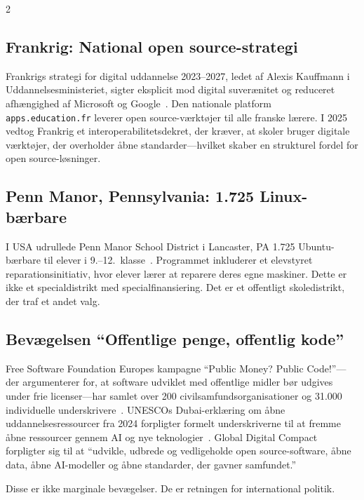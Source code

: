 \documentclass[11pt, a4paper]{article}
\begin{document}
\begin{multicols}{2}
\subsection{Frankrig: National open source-strategi}

Frankrigs strategi for digital uddannelse 2023--2027, ledet af Alexis Kauffmann i Uddannelsesministeriet, sigter eksplicit mod digital suverænitet og reduceret afhængighed af Microsoft og Google~\citep{france2023digital}. Den nationale platform \texttt{apps.education.fr} leverer open source-værktøjer til alle franske lærere. I 2025 vedtog Frankrig et interoperabilitetsdekret, der kræver, at skoler bruger digitale værktøjer, der overholder åbne standarder---hvilket skaber en strukturel fordel for open source-løsninger.

\subsection{Penn Manor, Pennsylvania: 1.725 Linux-bærbare}

I USA udrullede Penn Manor School District i Lancaster, PA 1.725 Ubuntu-bærbare til elever i 9.--12.\ klasse~\citep{pennmanor2024linux}. Programmet inkluderer et elevstyret reparationsinitiativ, hvor elever lærer at reparere deres egne maskiner. Dette er ikke et specialdistrikt med specialfinansiering. Det er et offentligt skoledistrikt, der traf et andet valg.

\subsection{Bevægelsen ``Offentlige penge, offentlig kode''}

Free Software Foundation Europes kampagne ``Public Money? Public Code!''---der argumenterer for, at software udviklet med offentlige midler bør udgives under frie licenser---har samlet over 200 civilsamfundsorganisationer og 31.000 individuelle underskrivere~\citep{fsfe2024publiccode}. UNESCOs Dubai-erklæring om åbne uddannelsesressourcer fra 2024 forpligter formelt underskriverne til at fremme åbne ressourcer gennem AI og nye teknologier~\citep{unesco2024oer}. Global Digital Compact forpligter sig til at ``udvikle, udbrede og vedligeholde open source-software, åbne data, åbne AI-modeller og åbne standarder, der gavner samfundet.''

Disse er ikke marginale bevægelser. De er retningen for international politik.



\end{multicols}
\end{document}
